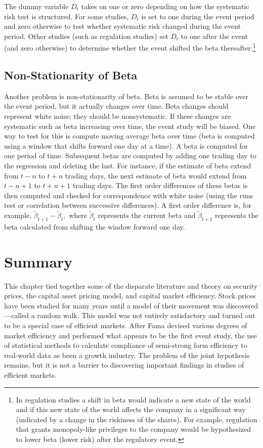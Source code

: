 The dummy variable $D_{t}$ takes on one or zero depending on how the systematic risk test is structured. For some studies, $D_{t}$ is set to one during the event period and zero otherwise to test whether systematic risk changed during the event period. Other studies (such as regulation studies) set $D_{t}$ to one after the event (and zero otherwise) to determine whether the event shifted the beta thereafter.\footnote{In regulation studies a shift in beta would indicate a new state of the world and if this new state of the world affects the company in a significant way (indicated by a change in the riskiness of the shares). For example, regulation that grants monopoly-like privileges to the company would be hypothesized to lower beta (lower risk) after the regulatory event.}

\subsection{Non-Stationarity of Beta}

Another problem is non-stationarity of beta. Beta is assumed to be stable over the event period, but it actually changes over time. Beta changes should represent white noise; they should be nonsystematic. If these changes are systematic such as beta increasing over time, the event study will be biased. One way to test for this is compute moving average beta over time (beta is computed using a window that shifts forward one day at a time). A beta is computed for one period of time. Subsequent betas are computed by adding one trading day to the regression and deleting the last. For instance, if the estimate of beta extend from $t-n$ to $t+n$ trading days, the next estimate of beta would extend from $t-n+1$ to $t+n+1$ trading days. The first order differences of these betas is then computed and checked for correspondence with white noise (using the runs test or correlation between successive differences). A first order difference is, for example, $\tilde \beta_{t+1} - \tilde \beta_{t},$ where $\tilde \beta_{t}$ represents the current beta and $\tilde \beta_{t+1}$ represents the beta calculated from shifting the window forward one day.

\section{Summary}

This chapter tied together some of the disparate literature and theory on security prices, the capital asset pricing model, and capital market efficiency. Stock prices have been studied for many years until a model of their movement was discovered---called a random walk. This model was not entirely satisfactory and turned out to be a special case of efficient markets. After Fama devised various degrees of market efficiency and performed what appears to be the first event study, the use of statistical methods to calculate compliance of semi-strong form efficiency to real-world data as been a growth industry. The problem of the joint hypothesis remains, but it is not a barrier to discovering important findings in studies of efficient markets.

